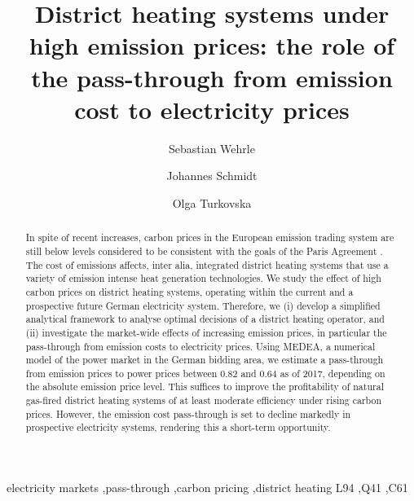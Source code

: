 \documentclass[preprint, 12pt, authoryear]{elsarticle}
\begin{document}
\begin{frontmatter}
\title{District heating systems under high  emission prices: the role of the pass-through from emission cost to electricity prices}

\author[1,2]{Sebastian Wehrle}

\author[1]{Johannes Schmidt}

\author[1]{Olga Turkovska}


\address[1]{Institute for Sustainable Economic Development, University of Natural Resources and Life Sciences, Feistmantelstrasse 4, 1180 Vienna, Austria}

\address[2]{Wiener Netze GmbH, Erdbergstrasse 236, 1110 Vienna, Austria}

\begin{abstract}
In spite of recent increases, carbon prices in the European emission trading system are still below levels considered to be consistent with the goals of the Paris Agreement \citep[e.g.][]{Parry2018, OECD2018}.
The cost of  emissions affects, inter alia, integrated district heating systems that use a variety of emission intense heat generation technologies. 
We study the effect of high carbon prices on district heating systems, operating within the current and a prospective future German electricity system.
Therefore, we (i) develop a simplified analytical framework to analyse optimal decisions of a district heating operator, and (ii) investigate the market-wide effects of increasing emission prices, in particular the pass-through from emission costs to electricity prices.
Using MEDEA, a numerical model of the power market in the German bidding area, we estimate a pass-through from  emission prices to power prices between $0.82$ and $0.64$ as of 2017, depending on the absolute emission price level.
This suffices to improve the profitability of  natural gas-fired district heating systems of at least moderate efficiency under rising carbon prices. 
However, the emission cost pass-through is set to decline markedly in prospective electricity systems, rendering this a short-term opportunity.
\end{abstract}

\begin{keyword}
electricity markets \sep pass-through \sep carbon pricing \sep district heating
\JEL L94 \sep Q41 \sep C61
\end{keyword}
\end{frontmatter}
\newpage
\end{document}
